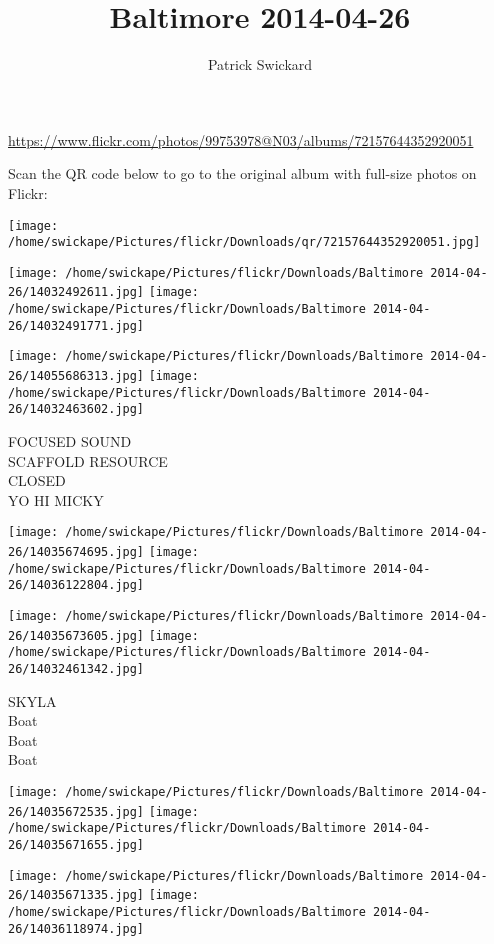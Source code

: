 \documentclass[10pt,letterpaper]{article}
\title{Baltimore 2014-04-26}
\author{Patrick Swickard}
\date{}
\begin{document}
\maketitle

\url{https://www.flickr.com/photos/99753978@N03/albums/72157644352920051}

Scan the QR code below to go to the original album with full-size photos on Flickr:

\texttt{[image: /home/swickape/Pictures/flickr/Downloads/qr/72157644352920051.jpg]}
\pagebreak

\texttt{[image: /home/swickape/Pictures/flickr/Downloads/Baltimore 2014-04-26/14032492611.jpg]}
\texttt{[image: /home/swickape/Pictures/flickr/Downloads/Baltimore 2014-04-26/14032491771.jpg]}

\texttt{[image: /home/swickape/Pictures/flickr/Downloads/Baltimore 2014-04-26/14055686313.jpg]}
\texttt{[image: /home/swickape/Pictures/flickr/Downloads/Baltimore 2014-04-26/14032463602.jpg]}

FOCUSED SOUND\\
SCAFFOLD RESOURCE\\
CLOSED\\
YO HI MICKY
\pagebreak

\texttt{[image: /home/swickape/Pictures/flickr/Downloads/Baltimore 2014-04-26/14035674695.jpg]}
\texttt{[image: /home/swickape/Pictures/flickr/Downloads/Baltimore 2014-04-26/14036122804.jpg]}

\texttt{[image: /home/swickape/Pictures/flickr/Downloads/Baltimore 2014-04-26/14035673605.jpg]}
\texttt{[image: /home/swickape/Pictures/flickr/Downloads/Baltimore 2014-04-26/14032461342.jpg]}

SKYLA\\
Boat\\
Boat\\
Boat
\pagebreak

\texttt{[image: /home/swickape/Pictures/flickr/Downloads/Baltimore 2014-04-26/14035672535.jpg]}
\texttt{[image: /home/swickape/Pictures/flickr/Downloads/Baltimore 2014-04-26/14035671655.jpg]}

\texttt{[image: /home/swickape/Pictures/flickr/Downloads/Baltimore 2014-04-26/14035671335.jpg]}
\texttt{[image: /home/swickape/Pictures/flickr/Downloads/Baltimore 2014-04-26/14036118974.jpg]}
\end{document}
